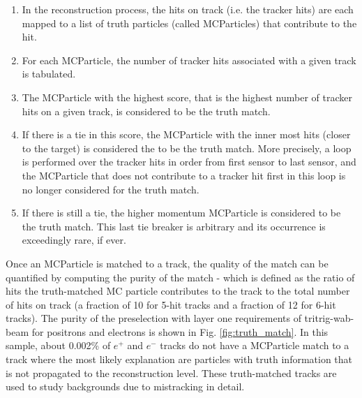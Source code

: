 \begin{enumerate}
  \item In the reconstruction process, the hits on track (i.e. the tracker hits) are each mapped to a list of truth particles (called MCParticles) that contribute to the hit.
  \item For each MCParticle, the number of tracker hits associated with a given track is tabulated.
  \item The MCParticle with the highest score, that is the highest number of tracker hits on a given track, is considered to be the truth match.
  \item If there is a tie in this score, the MCParticle with the inner most hits (closer to the target) is considered the to be the truth match. More precisely, a loop is performed over the tracker hits in order from first sensor to last sensor, and the MCParticle that does not contribute to a tracker hit first in this loop is no longer considered for the truth match.
  \item If there is still a tie, the higher momentum MCParticle is considered to be the truth match. This last tie breaker is arbitrary and its occurrence is exceedingly rare, if ever.
\end{enumerate}


Once an MCParticle is matched to a track, the quality of the match can be quantified by computing the purity of the match - which is defined as the ratio of hits the truth-matched MC particle contributes to the track to the total number of hits on track (a fraction of 10 for 5-hit tracks and a fraction of 12 for 6-hit tracks). The purity of the preselection with layer one requirements of tritrig-wab-beam for positrons and electrons is shown in Fig. \ref{fig:truth_match}. In this sample, about 0.002\% of $e^+$ and $e^-$ tracks do not have a MCParticle match to a track where the most likely explanation are particles with truth information that is not propagated to the reconstruction level. These truth-matched tracks are used to study backgrounds due to mistracking in detail.

